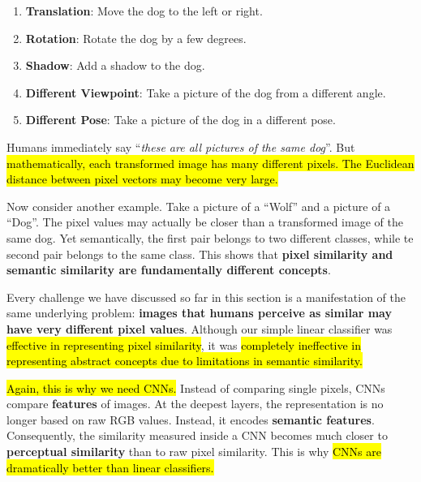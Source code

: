 \begin{enumerate}
    \item \textbf{Translation}: Move the dog to the left or right.
    \item \textbf{Rotation}: Rotate the dog by a few degrees.
    \item \textbf{Shadow}: Add a shadow to the dog.
    \item \textbf{Different Viewpoint}: Take a picture of the dog from a different angle.
    \item \textbf{Different Pose}: Take a picture of the dog in a different pose.
\end{enumerate}
Humans immediately say ``\emph{these are all pictures of the same dog}''. But \hl{mathematically, each transformed image has many different pixels. The Euclidean distance between pixel vectors may become very large.}

\highspace
Now consider another example. Take a picture of a ``Wolf'' and a picture of a ``Dog''. The pixel values may actually be closer than a transformed image of the same dog. Yet semantically, the first pair belongs to two different classes, while te second pair belongs to the same class. This shows that \textbf{pixel similarity and semantic similarity are fundamentally different concepts}.

\highspace
Every challenge we have discussed so far in this section is a manifestation of the same underlying problem: \textbf{images that humans perceive as similar may have very different pixel values}. Although our simple linear classifier was \hl{effective in representing pixel similarity}, it was \hl{completely ineffective in representing abstract concepts due to limitations in semantic similarity.}

\highspace
\hl{Again, this is why we need CNNs.} Instead of comparing single pixels, CNNs compare \textbf{features} of images. At the deepest layers, the representation is no longer based on raw RGB values. Instead, it encodes \textbf{semantic features}. Consequently, the similarity measured inside a CNN becomes much closer to \textbf{perceptual similarity} than to raw pixel similarity. This is why \hl{CNNs are dramatically better than linear classifiers.}